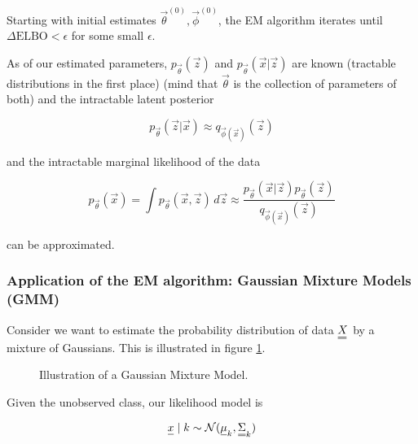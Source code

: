 Starting with initial estimates $\vec{\theta}^{(0)}, \vec{\phi}^{(0)}$, the EM algorithm iterates
until $\Delta \text{ELBO} < \epsilon$ for some small $\epsilon$.



As of our estimated parameters, $p_\vec{\theta}(\vec{z})$ and $p_\vec{\theta}(\vec{x} | \vec{z})$ are known
(tractable distributions in the first place) (mind that $\vec{\theta}$ is the collection
of parameters of both) and the intractable latent posterior

\begin{equation}
    p_\vec{\theta}(\vec{z} | \vec{x}) \approx q_{\vec{\phi}(\vec{x})}(\vec{z})
\end{equation}

and the intractable marginal likelihood of the data

\begin{equation}
    p_\vec{\theta}(\vec{x}) = \int p_\vec{\theta}(\vec{x}, \vec{z}) \, d\vec{z} \approx \frac{p_\vec{\theta}(\vec{x}|\vec{z})p_\vec{\theta}(\vec{z})}{q_{\vec{\phi}(\vec{x})}(\vec{z})}
\end{equation}

can be approximated.

\subsubsection{Application of the EM algorithm: Gaussian Mixture Models (GMM)}
Consider we want to estimate the probability distribution of data $\mat{X}$ by 
a mixture of Gaussians. This is illustrated in figure \ref{fig:gmm}.


\begin{figure}[!htb]
    \centering
    
    \caption{Illustration of a Gaussian Mixture Model.}
    \label{fig:gmm}
\end{figure}

Given the unobserved class, our likelihood model is

\begin{equation}
    \vec{x} \mid k \sim \mathcal{N}( \vec{\mu}_k, \mat{\Sigma}_k)
\end{equation}

